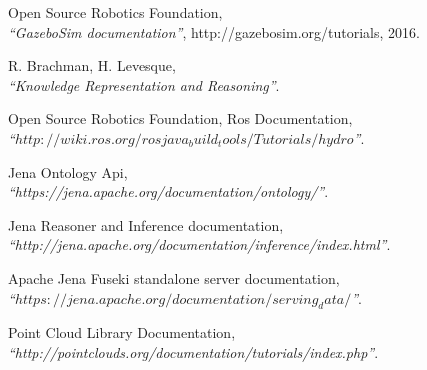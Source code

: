 \documentclass[a4paper, 12pt]{article}
\numberwithin{equation}{section}
\begin{document}
\begin{thebibliography}{11}
     Open Source Robotics Foundation,\\
            \emph{``GazeboSim documentation''}, http://gazebosim.org/tutorials, 2016.
                       
     R. Brachman, H. Levesque,\\
            \emph{``Knowledge Representation and Reasoning''}.
            
     Open Source Robotics Foundation, Ros Documentation,\\
            \emph{``$http://wiki.ros.org/rosjava_build_tools/Tutorials/hydro$''}.
            
     Jena Ontology Api, \\
            \emph{``https://jena.apache.org/documentation/ontology/''}.
            
     Jena Reasoner and Inference documentation,\\
            \emph{``http://jena.apache.org/documentation/inference/index.html''}.
            
            
     Apache Jena Fuseki standalone server documentation,\\
            \emph{``$https://jena.apache.org/documentation/serving_data/$''}.
            

     Point Cloud Library Documentation, \\
            \emph{``http://pointclouds.org/documentation/tutorials/index.php''}.            
          
            
            
            
    

        
\end{thebibliography}
\end{document}
